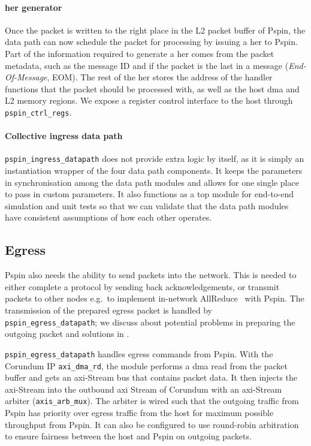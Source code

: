 \paragraph{\ac{her} generator} Once the packet is written to the right place in the L2 packet buffer of P\acs{spin}, the data path can now schedule the packet for processing by issuing a \ac{her} to P\acs{spin}.  Part of the information required to generate a \ac{her} comes from the packet metadata, such as the message ID and if the packet is the last in a message (\emph{End-Of-Message}, EOM).  The rest of the \ac{her} stores the address of the handler functions that the packet should be processed with, as well as the host \ac{dma} and L2 memory regions.  We expose a register control interface to the host through \texttt{pspin\_\-ctrl\_\-regs}.

\paragraph{Collective ingress data path} \texttt{pspin\_\-ingress\_\-datapath} does not provide extra logic by itself, as it is simply an instantiation wrapper of the four data path components.  It keeps the parameters in synchronisation among the data path modules and allows for one single place to pass in custom parameters.  It also functions as a top module for end-to-end simulation and unit tests so that we can validate that the data path modules have consistent assumptions of how each other operates.
 
\subsection{Egress}

P\acs{spin} also needs the ability to send packets into the network.  This is needed to either complete a protocol by sending back acknowledgements, or transmit packets to other nodes e.g.\ to implement in-network AllReduce~\cite{de_sensi_flare_2021} with P\acs{spin}.  The transmission of the prepared egress packet is handled by \texttt{pspin\_\-egress\_\-datapath}; we discuss about potential problems in preparing the outgoing packet and solutions in .

\texttt{pspin\_\-egress\_\-datapath} handles egress commands from P\acs{spin}.  With the Corundum IP \texttt{axi\_\-dma\_\-rd}, the module performs a \ac{dma} read from the packet buffer and gets an \ac{axi}-Stream bus that contains packet data.  It then injects the \ac{axi}-Stream into the outbound \ac{axi} Stream of Corundum with an \ac{axi}-Stream arbiter (\texttt{axis\_arb\_mux}).  The arbiter is wired such that the outgoing traffic from P\acs{spin} has priority over egress traffic from the host for maximum possible throughput from P\acs{spin}.  It can also be configured to use round-robin arbitration to ensure fairness between the host and P\acs{spin} on outgoing packets.

